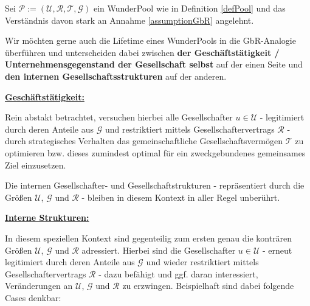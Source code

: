 \begin{Fazit}
\label{lifetimeGbR} 

Sei $\mathcal{P} := \left( \mathcal{U}, \mathcal{R}, \mathcal{T}, \mathcal{G} \right)$ ein WunderPool wie in Definition \ref{defPool} und das Verständnis davon stark an Annahme \ref{assumptionGbR} angelehnt.

\vspace{0.2cm}

Wir möchten gerne auch die Lifetime eines WunderPools in die GbR-Analogie überführen und unterscheiden dabei zwischen \textbf{der Geschäftstätigkeit / Unterneh\-mensgegenstand der Gesellschaft selbst} auf der einen Seite und \textbf{den internen Gesellschaftsstrukturen} auf der anderen.

\noindent\hrulefill

\textbf{\underline{Geschäftstätigkeit:}}

\vspace{0.2cm}

Rein abstakt betrachtet, versuchen hierbei alle Gesellschafter $u \in \mathcal{U}$ - legiti\-miert durch deren Anteile aus $\mathcal{G}$ und restriktiert mittels Gesellschaftervertrags $\mathcal{R}$ - durch strategisches Verhalten das gemeinschaftliche Gesellschaftsvermögen $\mathcal{T}$ zu optimieren bzw. dieses zumindest optimal für ein zweckgebundenes gemeinsames Ziel einzusetzen.

\vspace{0.2cm}

Die internen Gesellschafter- und Gesellschaftstrukturen - repräsentiert durch die Größen $\mathcal{U}$, $\mathcal{G}$ und $\mathcal{R}$ - bleiben in diesem Kontext in aller Regel unberührt.

\noindent\hrulefill

\textbf{\underline{Interne Strukturen:}}

\vspace{0.2cm}

In diesem speziellen Kontext sind gegenteilig zum ersten genau die konträren Größen $\mathcal{U}$, $\mathcal{G}$ und $\mathcal{R}$ adressiert. Hierbei sind die Gesellschafter $u \in \mathcal{U}$ - erneut legitimiert durch deren Anteile aus $\mathcal{G}$ und wieder restriktiert mittels Gesellschaftervertrags $\mathcal{R}$ - dazu befähigt und ggf. daran interessiert, Veränderungen an $\mathcal{U}$, $\mathcal{G}$ und $\mathcal{R}$ zu erzwingen. Beispielhaft sind dabei folgende Cases denkbar:


\end{Fazit}
